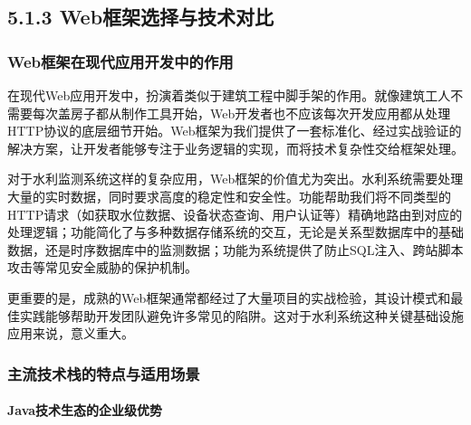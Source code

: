\hypertarget{webux6846ux67b6ux9009ux62e9ux4e0eux6280ux672fux5bf9ux6bd4}{%
\subsection{5.1.3 Web框架选择与技术对比}\label{webux6846ux67b6ux9009ux62e9ux4e0eux6280ux672fux5bf9ux6bd4}}

\hypertarget{webux6846ux67b6ux5728ux73b0ux4ee3ux5e94ux7528ux5f00ux53d1ux4e2dux7684ux4f5cux7528}{%
\subsubsection{Web框架在现代应用开发中的作用}\label{webux6846ux67b6ux5728ux73b0ux4ee3ux5e94ux7528ux5f00ux53d1ux4e2dux7684ux4f5cux7528}}

在现代Web应用开发中，扮演着类似于建筑工程中脚手架的作用。就像建筑工人不需要每次盖房子都从制作工具开始，Web开发者也不应该每次开发应用都从处理HTTP协议的底层细节开始。Web框架为我们提供了一套标准化、经过实战验证的解决方案，让开发者能够专注于业务逻辑的实现，而将技术复杂性交给框架处理。

对于水利监测系统这样的复杂应用，Web框架的价值尤为突出。水利系统需要处理大量的实时数据，同时要求高度的稳定性和安全性。功能帮助我们将不同类型的HTTP请求（如获取水位数据、设备状态查询、用户认证等）精确地路由到对应的处理逻辑；功能简化了与多种数据存储系统的交互，无论是关系型数据库中的基础数据，还是时序数据库中的监测数据；功能为系统提供了防止SQL注入、跨站脚本攻击等常见安全威胁的保护机制。

更重要的是，成熟的Web框架通常都经过了大量项目的实战检验，其设计模式和最佳实践能够帮助开发团队避免许多常见的陷阱。这对于水利系统这种关键基础设施应用来说，意义重大。

\hypertarget{ux4e3bux6d41ux6280ux672fux6808ux7684ux7279ux70b9ux4e0eux9002ux7528ux573aux666f}{%
\subsubsection{主流技术栈的特点与适用场景}\label{ux4e3bux6d41ux6280ux672fux6808ux7684ux7279ux70b9ux4e0eux9002ux7528ux573aux666f}}

\hypertarget{javaux6280ux672fux751fux6001ux7684ux4f01ux4e1aux7ea7ux4f18ux52bf}{%
\paragraph{Java技术生态的企业级优势}\label{javaux6280ux672fux751fux6001ux7684ux4f01ux4e1aux7ea7ux4f18ux52bf}}

